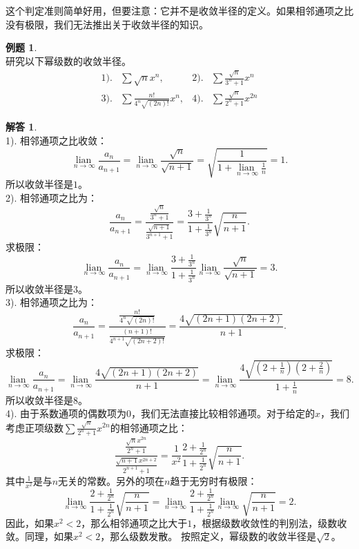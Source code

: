 \documentclass[12pt,UTF8]{ctexbook}
\newcommand{\lian}[1]{
    \underset{#1}{\operatorname{lian}\,}
}
\theoremstyle{definition}
\newtheorem{et}{例题}[section]
\newtheorem*{so}{解答}
\theoremstyle{plain}
\begin{document}
这个判定准则简单好用，但要注意：它并不是收敛半径的定义。如果相邻通项之比没有极限，我们无法推出关于收敛半径的知识。

\begin{et}    
    \mbox{} \\
    研究以下幂级数的收敛半径。\\
    \begin{align*}
        1).& \sum \sqrt{n} x^n,  &2).& \sum \frac{\sqrt{n}}{3^n + 1} x^n \\
        3).& \sum \frac{n!}{4^n\sqrt{(2n)!}} x^n,  & 4).& \sum \frac{\sqrt{n}}{2^n+1} x^{2n} 
    \end{align*}
\end{et}

\begin{so}
    \mbox{} \\
    1). 相邻通项之比收敛：
    $$ \lian{n\to\infty} \frac{a_n}{a_{n+1}} = \lian{n\to\infty} \frac{\sqrt{n}}{\sqrt{n+1}} = \sqrt{\frac{1}{1 + \lian{n\to\infty} \frac{1}{n}}} = 1. $$
    所以收敛半径是$1$。\\
    2). 相邻通项之比为：
    $$ \frac{a_n}{a_{n+1}} = \frac{\frac{\sqrt{n}}{3^n + 1}}{\frac{\sqrt{n+1}}{3^{n+1} + 1}} = \frac{3 + \frac{1}{3^n}}{1 + \frac{1}{3^n}}\sqrt{\frac{n}{n+1}}. $$
    求极限：
    $$ \lian{n\to\infty} \frac{a_n}{a_{n+1}} = \lian{n\to\infty} \frac{3 + \frac{1}{3^n}}{1 + \frac{1}{3^n}}\lian{n\to\infty} \frac{\sqrt{n}}{\sqrt{n+1}} = 3. $$
    所以收敛半径是$3$。\\
    3). 相邻通项之比为：
    $$ \frac{a_n}{a_{n+1}} = \frac{\frac{n!}{4^n\sqrt{(2n)!}}}{\frac{(n+1)!}{4^{n+1}\sqrt{(2n+2)!}}} = \frac{4\sqrt{(2n+1)(2n+2)}}{n+1}. $$
    求极限：
    $$ \lian{n\to\infty} \frac{a_n}{a_{n+1}} = \lian{n\to\infty}\frac{4\sqrt{(2n+1)(2n+2)}}{n+1} = \lian{n\to\infty}\frac{4\sqrt{(2+\frac{1}{n})(2+\frac{2}{n})}}{1+\frac{1}{n}} = 8. $$
    所以收敛半径是$8$。\\
    4). 由于系数通项的偶数项为$0$，我们无法直接比较相邻通项。对于给定的$x$，我们考虑正项级数$\sum \frac{\sqrt{n}}{2^n+1} x^{2n}$的相邻通项之比：
    $$ \frac{\frac{\sqrt{n}x^{2n}}{2^n+1}}{\frac{\sqrt{n+1}x^{2n+2}}{2^{n+1}+1}} = \frac{1}{x^2}\frac{2 + \frac{1}{2^n}}{1 + \frac{1}{2^n}}\sqrt{\frac{n}{n+1}}. $$
    其中$\frac{1}{x^2}$是与$n$无关的常数。另外的项在$n$趋于无穷时有极限：
    $$ \lian{n\to\infty}\frac{2 + \frac{1}{2^n}}{1 + \frac{1}{2^n}}\sqrt{\frac{n}{n+1}} = \lian{n\to\infty}\frac{2 + \frac{1}{2^n}}{1 + \frac{1}{2^n}}\lian{n\to\infty}\sqrt{\frac{n}{n+1}} = 2. $$
    因此，如果$x^2<2$，那么相邻通项之比大于$1$，根据级数收敛性的判别法，级数收敛。同理，如果$x^2<2$，那么级数发散。
    按照定义，幂级数的收敛半径是$\sqrt{2}$。

\end{so}
\end{document}
